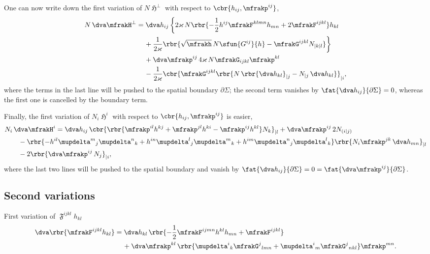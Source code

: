 \documentclass[a4paper,11pt]{article}
\begin{document}
One can now write down the first variation of $N\mfrakH^\perp$ with respect to 
$\cbr{h_{ij}, \mfrakp^{ij}}$,
\begin{align}
N\,\dva \mfrakH^\perp &= \dva h_{ij}\,\bigg\{
2\varkappa\,N\rbr{ -\frac{1}{2}h^{ij} \mfrakF^{klmn} h_{mn}
+ 2 \mfrakF^{ijkl}} h_{kl}
\nonumber \\
&\quad\,
+\frac{1}{2\varkappa}
\rbr{ \sqrt{\mfrakh}\,N\sfun{G^{ij}}{h}
-\mfrakG^{ijkl}N_{|k|l}}\bigg\}
\nonumber \\
&\quad\,
+\dva \mfrakp^{ij}\,4\varkappa\,N\mfrakG_{ijkl}\mfrakp^{kl}
\nonumber \\
&\quad\,
-\frac{1}{2\varkappa}
\cbr{\mfrakG^{ijkl}
\rbr{N\,\rbr{\dva h_{kl}}_{|j} - N_{|j}\,\dva h_{kl}} }_{|i},
\end{align}
where the terms in the last line will be pushed to the spatial boundary
$\partial\Sigma$; the second term
vanishes by $\fat{\dva h_{ij}}{\partial\Sigma} = 0$, whereas the first one is
cancelled by the boundary term.

Finally, the first variation of $N_i \mfrakH^i$ with respect to $\cbr{h_{ij},
\mfrakp^{ij}}$ is easier,
\begin{align}
&
N_i\,\dva \mfrakH^i = \dva h_{ij}\,
\cbr{\rbr{\mfrakp^{il}h^{kj}+\mfrakp^{jl}h^{ki}-\mfrakp^{ij}h^{kl}}N_k}_{|l}
+\dva \mfrakp^{ij}\,2N_{(i|j)}
\nonumber \\
&\qquad
- \rbr{-h^{il}\mupdelta^m{}_j\mupdelta^n{}_k
+h^{in}\mupdelta^l{}_j\mupdelta^m{}_k
+h^{im}\mupdelta^n{}_j\mupdelta^l{}_k}
\rbr{N_i\mfrakp^{jk}\,\dva h_{mn}}_{|l}
\nonumber \\
&\qquad
- 2\rbr{\dva \mfrakp^{ij}\,N_{j}}_{|i},
\end{align}
where the last two lines will be pushed to the spatial boundary and vanish by
$\fat{\dva h_{ij}}{\partial\Sigma} = 0 =
\fat{\dva \mfrakp^{ij}}{\partial\Sigma}$.

\subsection*{Second variations}

First variation of $\mfrakF^{ijkl}h_{kl}$
\begin{align}
\dva\rbr{\mfrakF^{ijkl}h_{kl}} &= \dva h_{kl}\,
\rbr{-\frac{1}{2}\mfrakF^{ijmn}h^{kl}h_{mn}+\mfrakF^{ijkl}}
\nonumber \\
&\quad\,
+\dva \mfrakp^{kl}\,\rbr{
\mupdelta^{i}{}_{k}\mfrakG^{j}{}_{lmn} +
\mupdelta^{i}{}_{m}\mfrakG^{j}{}_{nkl}}\mfrakp^{mn}.
\end{align}
\end{document}
